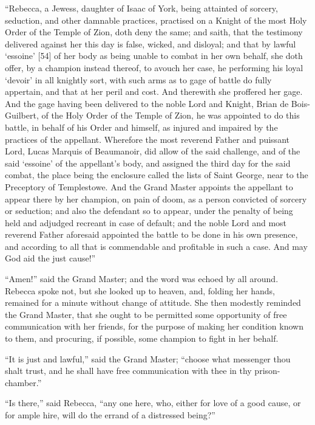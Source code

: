 ``Rebecca, a Jewess, daughter of Isaac of York, being attainted of
sorcery, seduction, and other damnable practices, practised on a Knight
of the most Holy Order of the Temple of Zion, doth deny the same; and
saith, that the testimony delivered against her this day is false,
wicked, and disloyal; and that by lawful `essoine' {[}54{]} of her body
as being unable to combat in her own behalf, she doth offer, by a
champion instead thereof, to avouch her case, he performing his loyal
`devoir' in all knightly sort, with such arms as to gage of battle do
fully appertain, and that at her peril and cost. And therewith she
proffered her gage. And the gage having been delivered to the noble Lord
and Knight, Brian de Bois-Guilbert, of the Holy Order of the Temple of
Zion, he was appointed to do this battle, in behalf of his Order and
himself, as injured and impaired by the practices of the appellant.
Wherefore the most reverend Father and puissant Lord, Lucas Marquis of
Beaumanoir, did allow of the said challenge, and of the said `essoine'
of the appellant's body, and assigned the third day for the said combat,
the place being the enclosure called the lists of Saint George, near to
the Preceptory of Templestowe. And the Grand Master appoints the
appellant to appear there by her champion, on pain of doom, as a person
convicted of sorcery or seduction; and also the defendant so to appear,
under the penalty of being held and adjudged recreant in case of
default; and the noble Lord and most reverend Father aforesaid appointed
the battle to be done in his own presence, and according to all that is
commendable and profitable in such a case. And may God aid the just
cause!''

``Amen!'' said the Grand Master; and the word was echoed by all around.
Rebecca spoke not, but she looked up to heaven, and, folding her hands,
remained for a minute without change of attitude. She then modestly
reminded the Grand Master, that she ought to be permitted some
opportunity of free communication with her friends, for the purpose of
making her condition known to them, and procuring, if possible, some
champion to fight in her behalf.

``It is just and lawful,'' said the Grand Master; ``choose what
messenger thou shalt trust, and he shall have free communication with
thee in thy prison-chamber.''

``Is there,'' said Rebecca, ``any one here, who, either for love of a
good cause, or for ample hire, will do the errand of a distressed
being?''

